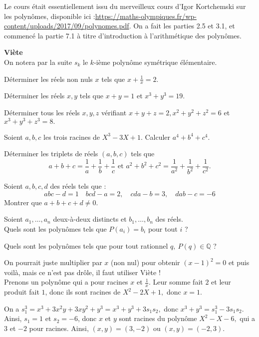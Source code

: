 Le cours était essentiellement issu du merveilleux cours d'Igor Kortchemski sur les polynômes, disponible ici :\url{https://maths-olympiques.fr/wp-content/uploads/2017/09/polynomes.pdf}. On a fait les parties 2.5 et 3.1, et commencé la partie 7.1 à titre d'introduction à l'arithmétique des polynômes.

\textbf{Viète}\\
On notera par la suite $s_k$ le $k$-ième polynôme symétrique élémentaire.
\begin{exo}
Déterminer les réels non nuls $x$ tels que $x+\frac1x=2.$
\end{exo}
\begin{exo}
Déterminer les réels $x,y$ tels que $x+y=1$ et $x^3+y^3=19$.
\end{exo}
\begin{exo}
Déterminer tous les réels $x,y,z$ vérifiant $x+y+z=2,x^2+y^2+z^2=6$ et $x^3+y^3+z^3=8.$
\end{exo}
\begin{exo}
Soient $a,b,c$ les trois racines de $X^3-3X+1$. Calculer $a^4+b^4+c^4$.
\end{exo}
\begin{exo}
Déterminer les triplets de réels $(a,b,c)$ tels que $$a+b+c=\frac1a+\frac1b+\frac1c\text{ et }a^2+b^2+c^2= \frac1{a^2}+\frac1{b^2}+\frac1{c^2}.$$ 
\end{exo}
\begin{exo}
Soient $a,b,c,d$ des réels tels que :$$abc-d=1\quad bcd-a=2,\quad cda-b=3,\quad dab-c=-6$$Montrer que $a+b+c+d\ne 0.$
\end{exo}
\begin{exo}
Soient $a_1,\ldots,a_n$ deux-à-deux distincts et $b_1,\ldots,b_n$ des réels.\\Quels sont les polynômes tels que $P(a_i)=b_i$ pour tout $i$ ?
\end{exo}
\begin{exo}
Quels sont les polynômes tels que pour tout rationnel $q,\:P(q)\in\mathbb Q$ ?
\end{exo}
\begin{sol}
On pourrait juste multiplier par $x$ (non nul) pour obtenir $(x-1)^2=0$ et puis voilà, mais ce n'est pas drôle, il faut utiliser Viète !\\
Prenons un polynôme qui a pour racines $x$ et $\frac 1x.$ Leur somme fait $2$ et leur produit fait $1$, donc ils sont racines de $X^2-2X+1,$ donc $x=1.$
\end{sol}
\begin{sol}
On a $s_1^3=x^3+3x^2y+3xy^2+y^3=x^3+y^3+3s_1s_2,$ donc $x^3+y^3=s_1^3-3s_1s_2$. Ainsi, $s_1=1$ et $s_2=-6$, donc $x$ et $y$ sont racines du polynôme $X^2-X-6,$ qui a $3$ et $-2$ pour racines. Ainsi, $(x,y)=(3,-2)$ ou $(x,y)=(-2,3)$.
\end{sol}
